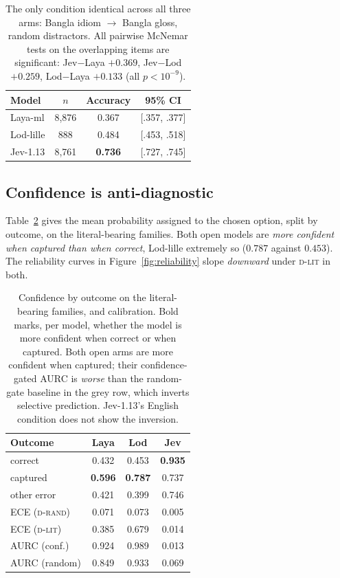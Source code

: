 \documentclass[11pt]{article}
\newcommand{\laya}[1]{\cellcolor{fLaya}#1}
\newcommand{\lod}[1]{\cellcolor{fLod}#1}
\newcommand{\jev}[1]{\cellcolor{fJev}#1}
\newcommand{\neu}[1]{\cellcolor{fGrey!55}#1}
\newcommand{\layah}[1]{\cellcolor{cLaya!55}\textbf{#1}}
\newcommand{\lodh}[1]{\cellcolor{cLod!42}\textbf{#1}}
\newcommand{\jevh}[1]{\cellcolor{cJev!62}\textbf{#1}}
\newcommand{\Drand}{\textsc{d-rand}}
\newcommand{\Dlit}{\textsc{d-lit}}
\begin{document}
\begin{table}[t]
\centering\small
\setlength{\tabcolsep}{4pt}
\begin{tabular}{lccc}
\toprule
\textbf{Model} & $n$ & \textbf{Accuracy} & \textbf{95\% CI} \\
\midrule
\laya{Laya-ml}   & \laya{8{,}876} & \laya{0.367} & \laya{[.357, .377]} \\
\lod{Lod-lille}  & \lod{888}      & \lod{0.484}  & \lod{[.453, .518]} \\
\jev{Jev-1.13}   & \jev{8{,}761}  & \jevh{0.736} & \jev{[.727, .745]} \\
\bottomrule
\end{tabular}
\caption{The only condition identical across all three arms: Bangla idiom
$\rightarrow$ Bangla gloss, random distractors. All pairwise McNemar tests on the
overlapping items are significant: Jev$-$Laya $+0.369$, Jev$-$Lod $+0.259$,
Lod$-$Laya $+0.133$ (all $p < 10^{-9}$).}
\label{tab:threeway}
\end{table}


\subsection{Confidence is anti-diagnostic}
\label{sec:confidence}

Table~\ref{tab:conf} gives the mean probability assigned to the chosen option,
split by outcome, on the literal-bearing families. Both open models are
\emph{more confident when captured than when correct}, Lod-lille extremely so
($0.787$ against $0.453$). The reliability curves in
Figure~\ref{fig:reliability} slope \emph{downward} under \Dlit{} in both.

\begin{table}[t]
\centering\small
\setlength{\tabcolsep}{4pt}
\begin{tabular}{lccc}
\toprule
\textbf{Outcome} & \laya{\textbf{Laya}} & \lod{\textbf{Lod}} & \jev{\textbf{Jev}} \\
\midrule
correct          & \laya{0.432} & \lod{0.453} & \jevh{0.935} \\
captured         & \layah{0.596} & \lodh{0.787} & \jev{0.737} \\
other error      & \laya{0.421} & \lod{0.399} & \jev{0.746} \\
\midrule
ECE (\Drand)     & \laya{0.071} & \lod{0.073} & \jev{0.005} \\
ECE (\Dlit)      & \laya{0.385} & \lod{0.679} & \jev{0.014} \\
AURC (conf.)     & \laya{0.924} & \lod{0.989} & \jev{0.013} \\
AURC (random)    & \neu{0.849} & \neu{0.933} & \neu{0.069} \\
\bottomrule
\end{tabular}
\caption{Confidence by outcome on the literal-bearing families, and calibration.
Bold marks, per model, whether the model is more confident when correct or when
captured. Both open arms are more confident when captured; their
confidence-gated AURC is \emph{worse} than the random-gate baseline in the grey
row, which inverts selective prediction. Jev-1.13's English condition does not
show the inversion.}
\label{tab:conf}
\end{table}
\end{document}
